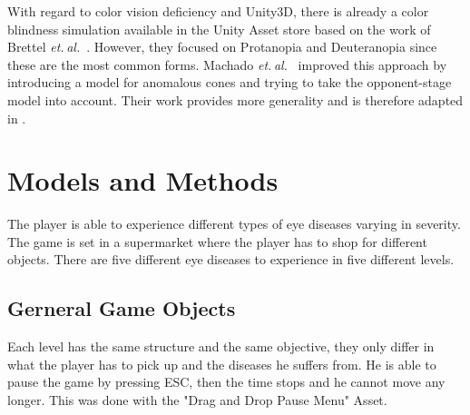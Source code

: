 \documentclass{sig-alternate-05-2015}
\newcommand{\etal}{\textit{et. al.}}
\begin{document}
With regard to color vision deficiency and Unity3D, there is already a color blindness simulation available in the Unity Asset store based on the work of Brettel \etal~\cite{brettel}.
However, they focused on Protanopia and Deuteranopia since these are the most common forms.
Machado \etal~\cite{Machado2009} improved this approach by introducing a model for anomalous cones and trying to take the opponent-stage model into account.
Their work provides more generality and is therefore adapted in .

\section{Models and Methods}

The player is able to experience different types of eye diseases varying in severity. The game is set in a supermarket where the player has to shop for different objects. There are five different eye diseases to experience in five different levels.

\subsection{Gerneral Game Objects}

Each level has the same structure and the same objective, they only differ in what the player has to pick up and the diseases he suffers from.
He is able to pause the game by pressing ESC, then the time stops and he cannot move any longer.
This was done with the "Drag and Drop Pause Menu" Asset. 
\end{document}
